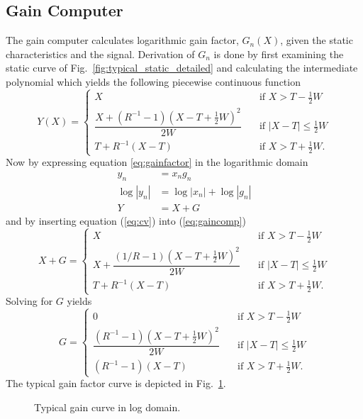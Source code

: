 \documentclass[../main2.tex]{subfiles}
\providecommand{\rootdir}{..}
\begin{document}
\subsection{Gain Computer} \label{gain_computer}
The gain computer calculates logarithmic gain factor, $G_n(X)$, given the static characteristics and the signal. Derivation of $G_n$ is done by first examining the static curve of Fig.~\ref{fig:typical_static_detailed} and calculating the intermediate polynomial which yields the following piecewise continuous function
\begin{equation} \label{eq:gaincomp}
Y(X) = \begin{cases}
    X & \quad \text{if }X> T-\frac{1}{2}W \\[0.8em]
    \dfrac{X+(R^{-1}-1)(X-T+\frac{1}{2}W)^2}{2W}& \quad \text{if } |X-T| \leq \frac{1}{2}W\\[1.2em]
    T+ R^{-1}(X-T) & \quad \text{if } X > T + \frac{1}{2}W.
\end{cases}
\end{equation}
Now  by expressing equation \eqref{eq:gainfactor} in the logarithmic domain
\begin{align}
y_n &= x_ng_n   \\
\log|y_n| & = \log|x_n| + \log|g_n|   \\
Y &= X + G \label{eq:cv}
\end{align}
and by inserting equation (\ref{eq:cv}) into (\ref{eq:gaincomp})
\begin{equation}
X+G = \begin{cases}
    X & \quad \text{if }X > T-\frac{1}{2}W \\[0.8em]
    X + \dfrac{(1/R-1)(X-T+\frac{1}{2}W)^2}{2W}& \quad \text{if } |X-T| \leq \frac{1}{2}W\\[1.2em]
    T+ R^{-1}(X-T) & \quad \text{if } X > T + \frac{1}{2}W.
\end{cases}
\end{equation}
Solving for $G$ yields
\begin{equation} \label{eq:c}
G = \begin{cases}
    0 & \quad \text{if }X >T -\frac{1}{2}W \\[0.8em]
    \dfrac{(R^{-1}-1)(X-T+\frac{1}{2}W)^2}{2W}& \quad \text{if } |X-T| \leq \frac{1}{2}W\\[1.2em]
    \left(R^{-1}-1\right)\left(X-T\right) & \quad \text{if } X > T + \frac{1}{2}W.
 \end{cases}
\end{equation}
The typical gain factor curve is depicted in Fig.~\ref{fig:typical_gain_detailed}.
\begin{figure}
\centerline{}
\caption{Typical gain curve in log domain.}
\label{fig:typical_gain_detailed}
\end{figure}
\end{document}
